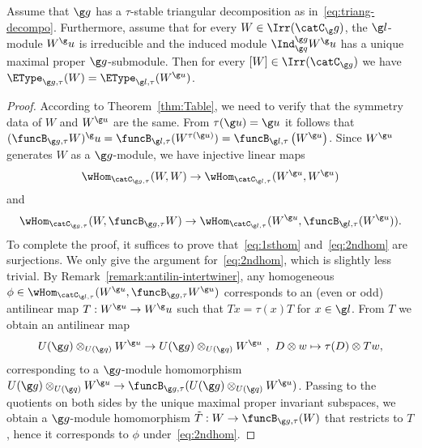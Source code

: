 \documentclass[12pt]{amsart}
\begin{document}
\begin{thm}
\label{thm:EtypeCplx1}
Assume that $\g g$ has a  $\tau$-stable triangular decomposition as in~\eqref{eq:triang-decompo}. Furthermore, assume that 
for every $W\in\Irr(\catC_\g g)$, the $\g l$-module $W^\g u$ is irreducible and the induced module $\Ind_{\g q}^{\g g}W^\g u$ has a unique maximal proper $\g g$-submodule. 
Then 
for every $[W]\in\Irr(\catC_{\g g})$ we have $\EType_{\g g,\tau}(W)= \EType_{\g l,\tau}(W^{\g u})$. 
\end{thm}
\begin{proof}
According to Theorem~\ref{thm:Table}, we need to verify that the symmetry data of $W$ and $W^{\g u}$ are the same. 
From $\tau(\g u)=\g u$ it follows that $(\funcB_{\g g,\tau}W)^\g u=\funcB_{\g l,\tau}(W^{\tau(\g u)})=\funcB_{\g l,\tau}\left(W^{\g u}\right)$. Since  $W^{\g u}$ generates $W$ as a $\g g$-module,  we have injective linear maps 
\begin{equation}
\label{eq:1sthom}
\wHom_{\catC_{\g g,\tau}}(W,W)\to 
\wHom_{\catC_{\g l,\tau}}(W^{\g u},W^{\g u})
\end{equation}
and
\begin{equation}
\label{eq:2ndhom}
\wHom_{\catC_{\g g,\tau}}(W,\funcB_{\g g,\tau}W)\to 
\wHom_{\catC_{\g l,\tau}}(W^{\g u},
\funcB_{\g l,\tau}
(W^{\g u})).
\end{equation}
To complete the proof, it suffices to prove that~\eqref{eq:1sthom} and~\eqref{eq:2ndhom} are surjections. We only give the argument for~\eqref{eq:2ndhom}, which is slightly less trivial.
By Remark~\ref{remark:antilin-intertwiner}, any homogeneous  $\phi\in \wHom_{\catC_{\g l,\tau}}(W^{\g u},
\funcB_{\g g,\tau}
W^{\g u})$ corresponds to an (even or odd) antilinear map 
$T:W^{\g u}\to W^\g u$ such that $T x=\tau(x)T$ for $x\in \g l$. From $T$ we obtain  an antilinear map
\[
U(\g g)\otimes_{U(\g q)}W^{\g u}\to 
U(\g g)\otimes_{U(\g q)}W^{\g u}\ ,\
D\otimes w\mapsto \tau(D)\otimes Tw,
\]
corresponding  to a $\g g$-module homomorphism
$U(\g g)\otimes_{U(\g q)}W^{\g u}\to \funcB_{\g g,\tau}(U(\g g)\otimes_{U(\g q)}W^{\g u})$. 
Passing to the quotients on both sides by the unique maximal proper invariant subspaces, we obtain a $\g g$-module homomorphism ${\tilde T}:W\to \funcB_{\g g,\tau}(W)$ that restricts to $T$, hence it corresponds to $\phi$ under~\eqref{eq:2ndhom}.    
\end{proof}


\end{document}
